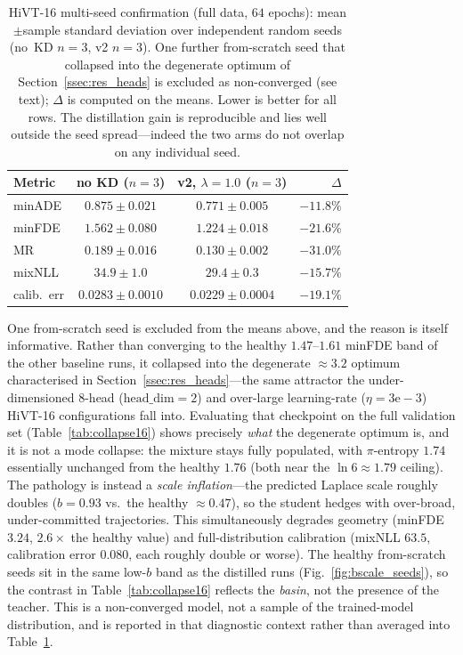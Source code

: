 \begin{table}[htbp]
  \centering
  \caption{HiVT-16 multi-seed confirmation (full data, $64$ epochs):
    mean$\pm$sample standard deviation over independent random seeds (no~KD
    $n{=}3$, v2 $n{=}3$). One further from-scratch seed that collapsed into the
    degenerate optimum of Section~\ref{ssec:res_heads} is excluded as
    non-converged (see text); $\Delta$ is computed on the means. Lower is better
    for all rows. The distillation gain is reproducible and lies well outside the
    seed spread---indeed the two arms do not overlap on any individual seed.}
  \label{tab:seeds16}
  \begin{tabular}{lccr}
    \toprule
    Metric & no KD ($n{=}3$) & v2, $\lambda{=}1.0$ ($n{=}3$) & $\Delta$ \\
    \midrule
    minADE      & $0.875 \pm 0.021$   & $0.771 \pm 0.005$   & $-11.8\%$ \\
    minFDE      & $1.562 \pm 0.080$   & $1.224 \pm 0.018$   & $-21.6\%$ \\
    MR          & $0.189 \pm 0.016$   & $0.130 \pm 0.002$   & $-31.0\%$ \\
    mixNLL      & $34.9 \pm 1.0$      & $29.4 \pm 0.3$      & $-15.7\%$ \\
    calib.\ err & $0.0283 \pm 0.0010$ & $0.0229 \pm 0.0004$ & $-19.1\%$ \\
    \bottomrule
  \end{tabular}
\end{table}

One from-scratch seed is excluded from the means above, and the reason is itself
informative. Rather than converging to the healthy $1.47$--$1.61$ minFDE band of the
other baseline runs, it collapsed into the degenerate $\approx\!3.2$ optimum
characterised in Section~\ref{ssec:res_heads}---the same attractor the
under-dimensioned $8$-head ($\mathrm{head\_dim}{=}2$) and over-large
learning-rate ($\eta{=}3\mathrm{e}{-}3$) HiVT-16 configurations fall into.
Evaluating that checkpoint on the full validation set
(Table~\ref{tab:collapse16}) shows precisely \emph{what} the degenerate optimum
is, and it is not a mode collapse: the mixture stays fully populated, with
$\pi$-entropy $1.74$ essentially unchanged from the healthy $1.76$ (both near the
$\ln 6\!\approx\!1.79$ ceiling). The pathology is instead a \emph{scale
inflation}---the predicted Laplace scale roughly doubles ($b\!=\!0.93$ vs.\ the
healthy $\approx\!0.47$), so the student hedges with over-broad, under-committed
trajectories. This simultaneously degrades geometry (minFDE $3.24$, $2.6\times$
the healthy value) and full-distribution calibration (mixNLL $63.5$, calibration
error $0.080$, each roughly double or worse). The healthy from-scratch seeds sit
in the same low-$b$ band as the distilled runs
(Fig.~\ref{fig:bscale_seeds}), so the contrast in Table~\ref{tab:collapse16}
reflects the \emph{basin}, not the presence of the teacher. This is a
non-converged model, not a sample of the trained-model distribution, and is
reported in that diagnostic context rather than averaged into
Table~\ref{tab:seeds16}.

